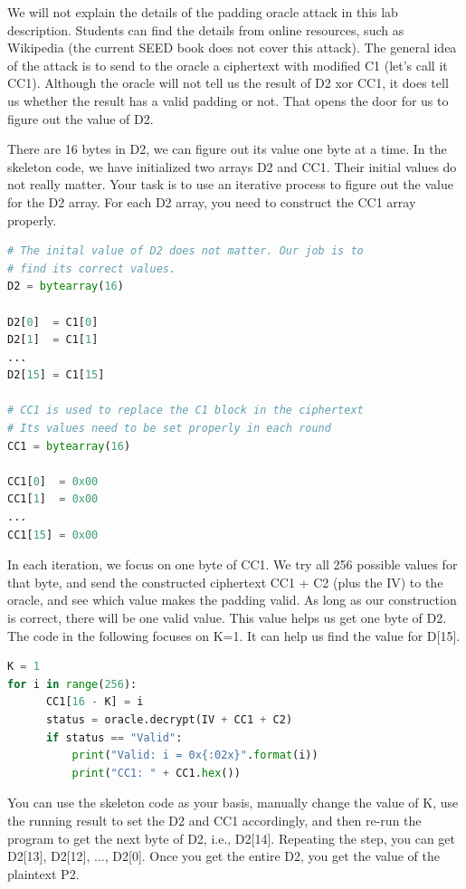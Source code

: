 We will not explain the details of the padding oracle attack
in this lab description. Students can find the details from
online resources, such as Wikipedia (the current SEED book does not 
cover this attack).  The general idea of the attack
is to send to the oracle a ciphertext with modified 
C1 (let's call it CC1). Although the oracle will not tell us the result 
of D2 xor CC1, it does tell us whether the result
has a valid padding or not. That opens the door 
for us to figure out the value of D2. 

There are 16 bytes in D2, we can figure out its value one 
byte at a time. In the skeleton code, we have initialized
two arrays D2 and CC1. Their initial values do not really matter.
Your task is to use an iterative process to figure 
out the value for the D2 array. For each D2 array, you need 
to construct the CC1 array properly. 

\begin{lstlisting}[language=python]
# The inital value of D2 does not matter. Our job is to 
# find its correct values. 
D2 = bytearray(16)

D2[0]  = C1[0]
D2[1]  = C1[1]
...
D2[15] = C1[15]

# CC1 is used to replace the C1 block in the ciphertext
# Its values need to be set properly in each round
CC1 = bytearray(16)

CC1[0]  = 0x00
CC1[1]  = 0x00
...
CC1[15] = 0x00
\end{lstlisting}

In each iteration, we focus on one byte of CC1.
We try all 256 possible values for that byte, and send the constructed
ciphertext CC1 + C2 (plus the IV) to the oracle, and see
which value makes the padding valid.
As long as our construction is correct, there will be
one valid value. This value helps us get one byte of D2.
The code in the following focuses on K=1. It can 
help us find the value for D[15].

\begin{lstlisting}[language=python]
K = 1
for i in range(256):
      CC1[16 - K] = i
      status = oracle.decrypt(IV + CC1 + C2)
      if status == "Valid":
          print("Valid: i = 0x{:02x}".format(i))
          print("CC1: " + CC1.hex())
\end{lstlisting}
 
You can use the skeleton code as your basis, manually
change the value of K, use the running result to 
set the D2 and CC1 accordingly, and then
re-run the program to get the next byte of D2, i.e., D2[14]. 
Repeating the step, you can get D2[13], D2[12], ..., D2[0].
Once you get the entire D2, you get the value of the plaintext P2. 

